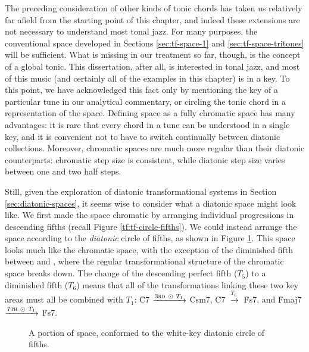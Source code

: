 The preceding consideration of other kinds of tonic chords has taken us
relatively far afield from the starting point of this chapter, and indeed
these extensions are not necessary to understand most tonal jazz. For many
purposes, the conventional space developed in Sections \ref{sec:tf-space-1}
and \ref{sec:tf-space-tritones} will be sufficient. What is missing in our
treatment so far, though, is the concept of a global tonic. This dissertation,
after all, is interested in tonal jazz, and most of this music (and certainly
all of the examples in this chapter) is in a key. To this point, we have
acknowledged this fact only by mentioning the key of a particular tune in our
analytical commentary, or circling the tonic chord in a representation of the
space. Defining \tf space as a fully chromatic space has many advantages: it
is rare that every chord in a tune can be understood in a single key, and it
is convenient not to have to switch continually between diatonic collections.
Moreover, chromatic spaces are much more regular than their diatonic
counterparts: chromatic step size is consistent, while diatonic step size
varies between one and two half steps.

Still, given the exploration of diatonic transformational systems in Section
\ref{sec:diatonic-spaces}, it seems wise to consider what a diatonic \tf space
might look like. We first made the space chromatic by arranging individual
\tfo progressions in descending fifths (recall Figure
\ref{tf:tf-circle-fifths}). We could instead arrange the space according to
the \emph{diatonic} circle of fifths, as shown in Figure
\ref{tfe:tf-diatonic-fifths}. This space looks much like the chromatic space,
with the exception of the diminished fifth between  and , where the
regular transformational structure of the chromatic space breaks down. The
change of the descending perfect fifth ($T_5$) to a diminished fifth ($T_6$)
means that all of the transformations linking these two key areas must all be
combined with $T_1$: \h{C7} $\xrightarrow{3\text{\textsc{rd}}\ \odot\ T_1}$
\h{Csm7}, \h{C7} $\xrightarrow{T_6\;}$ \h{Fs7}, and \h{Fmaj7}
$\xrightarrow{7\text{\textsc{th}}\ \odot\ T_1}$ \h{Fs7}.

\begin{figure}[tbp]
  \caption{A portion of \tf space, conformed to the white-key diatonic circle
    of fifths.}
  \label{tfe:tf-diatonic-fifths}
\end{figure}

